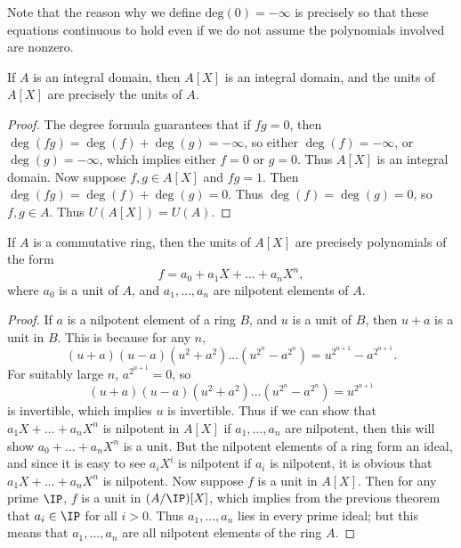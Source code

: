 \begin{remark}
    Note that the reason why we define $\text{deg}(0) = -\infty$ is precisely so that these equations continuous to hold even if we do not assume the polynomials involved are nonzero.
\end{remark}

\begin{lemma}
    If $A$ is an integral domain, then $A[X]$ is an integral domain, and the units of $A[X]$ are precisely the units of $A$.
\end{lemma}
\begin{proof}
    The degree formula guarantees that if $fg = 0$, then $\deg(fg) = \deg(f) + \deg(g) = -\infty$, so either $\deg(f) = -\infty$, or $\deg(g) = -\infty$, which implies either $f = 0$ or $g = 0$. Thus $A[X]$ is an integral domain. Now suppose $f,g \in A[X]$ and $fg = 1$. Then $\deg(fg) = \deg(f) + \deg(g) = 0$. Thus $\deg(f) = \deg(g) = 0$, so $f,g \in A$. Thus $U(A[X]) = U(A)$.
\end{proof}

\begin{corollary}
    If $A$ is a commutative ring, then the units of $A[X]$ are precisely polynomials of the form
    \[ f = a_0 + a_1 X + \dots + a_n X^n, \]
    where $a_0$ is a unit of $A$, and $a_1, \dots, a_n$ are nilpotent elements of $A$.
\end{corollary}
\begin{proof}
    If $a$ is a nilpotent element of a ring $B$, and $u$ is a unit of $B$, then $u + a$ is a unit in $B$. This is because for any $n$,
    \[ (u + a)(u - a)(u^2 + a^2)\dots (u^{2^n} - a^{2^n}) = u^{2^{n+1}} - a^{2^{n + 1}}. \]
    For suitably large $n$, $a^{2^{n+1}} = 0$, so
    \[ (u + a)(u - a)(u^2 + a^2)\dots (u^{2^n} - a^{2^n}) = u^{2^{n+1}} \]
    is invertible, which implies $u$ is invertible. Thus if we can show that $a_1 X + \dots + a_n X^n$ is nilpotent in $A[X]$ if $a_1, \dots, a_n$ are nilpotent, then this will show $a_0 + \dots + a_n X^n$ is a unit. But the nilpotent elements of a ring form an ideal, and since it is easy to see $a_i X^i$ is nilpotent if $a_i$ is nilpotent, it is obvious that $a_1 X + \dots + a_n X^n$ is nilpotent. Now suppose $f$ is a unit in $A[X]$. Then for any prime $\IP$, $f$ is a unit in $(A/\IP)[X]$, which implies from the previous theorem that $a_i \in \IP$ for all $i > 0$. Thus $a_1, \dots, a_n$ lies in every prime ideal; but this means that $a_1, \dots, a_n$ are all nilpotent elements of the ring $A$.
\end{proof}

